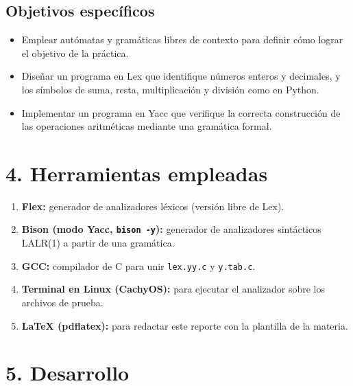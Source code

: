 \documentclass{article}
\begin{document}
    \subsection{Objetivos específicos}
    \begin{itemize}
        \item Emplear autómatas y gramáticas libres de contexto para definir cómo lograr el objetivo de la práctica.
        \item Diseñar un programa en Lex que identifique números enteros y decimales, y los símbolos de suma, resta, multiplicación y división como en Python.
        \item Implementar un programa en Yacc que verifique la correcta construcción de las operaciones aritméticas mediante una gramática formal.
    \end{itemize}

\section{4. Herramientas empleadas}
    \begin{enumerate}
        \item \textbf{Flex:} generador de analizadores léxicos (versión libre de Lex).
        \item \textbf{Bison (modo Yacc, \texttt{bison -y}):} generador de analizadores sintácticos LALR(1) a partir de una gramática.
        \item \textbf{GCC:} compilador de C para unir \texttt{lex.yy.c} y \texttt{y.tab.c}.
        \item \textbf{Terminal en Linux (CachyOS):} para ejecutar el analizador sobre los archivos de prueba.
        \item \textbf{\LaTeX{} (pdflatex):} para redactar este reporte con la plantilla de la materia.
    \end{enumerate}
    \newpage

\section{5. Desarrollo}
\end{document}
